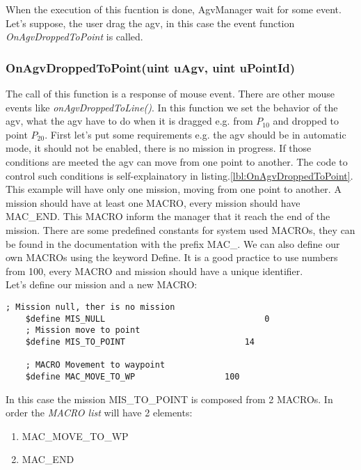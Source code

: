 When the execution of this fucntion is done, AgvManager wait for some event. Let's suppose, the user drag the agv, in this case the event function \textit{OnAgvDroppedToPoint} is called.




\subsubsection{OnAgvDroppedToPoint(uint uAgv, uint uPointId) }
The call of this function is a response of mouse event. There are other mouse events like \textit{onAgvDroppedToLine()}.
In this function we set the behavior of the agv, what the agv have to do when it is dragged e.g. from $P_{10}$ and dropped to point $P_{20}$.
First let's put some requirements e.g. the agv should be in automatic mode, it should not be enabled, there is no mission in progress.
If those conditions are meeted the agv can move from one point to another. The code to control such conditions is self-explainatory in listing.\ref{lbl:OnAgvDroppedToPoint}.\\

This example will have only one mission, moving from one point to another. A mission should have at least one MACRO, every mission should have MAC\_END. This MACRO inform the manager that it reach the end of the mission.
There are some predefined constants for system used MACROs, they can be found in the documentation with the prefix MAC\_.
We can also define our own MACROs using the keyword Define. It is a good practice to use numbers from 100, every MACRO and mission should have a unique identifier.\\

Let's define our mission and a new MACRO:
\begin{lstlisting}[frame=single]
	; Mission null, ther is no mission
	$define MIS_NULL								0
	; Mission move to point
	$define MIS_TO_POINT						14
	
	; MACRO Movement to waypoint
	$define MAC_MOVE_TO_WP					100
\end{lstlisting}

In this case the mission MIS\_TO\_POINT is composed from 2 MACROs. In order the \textit{MACRO list} will have 2 elements:
\begin{enumerate}
	\item MAC\_MOVE\_TO\_WP
	\item MAC\_END \\
\end{enumerate}

